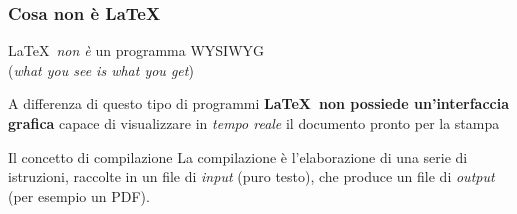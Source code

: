 \documentclass[10pt,svgnames,%
ucs,%
pdftex]{mybeamer}
\begin{document}
\begin{frame}
	\frametitle{Cosa non \`e \LaTeX}
	\begin{center}
		\LaTeX\ \emph{non \`e} un programma WYSIWYG\\
		(\textit{what you see is what you get})
	\end{center}
	\bigskip
	A differenza di questo tipo di programmi \textbf{\LaTeX\ non
		possiede un'interfaccia grafica} capace di visualizzare in
	\emph{tempo reale} il documento pronto per la stampa\\
	\bigskip
	\onslide<2->
	\begin{block}{Il concetto di compilazione} 
		La compilazione \`e l'elaborazione di una serie di istruzioni, raccolte in un file di   \emph{input} (puro testo), che produce un file di \emph{output} (per esempio un PDF).
	\end{block}
\end{frame}
\end{document}
